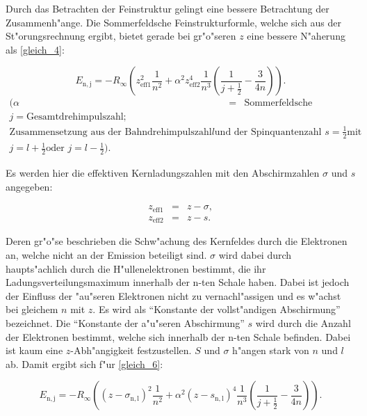 		Durch das Betrachten der Feinstruktur gelingt eine bessere Betrachtung der Zusammenh"ange.
		Die Sommerfeldsche Feinstrukturformle, welche sich aus der St"orungsrechnung ergibt, bietet gerade bei gr"o"seren $z$ eine bessere N"aherung als \ref{gleich_4}:

		\begin{equation}
			E_\mathrm{n,j} = -R_\infty \left(z_\mathrm{eff1}^2 \frac{1}{n^2} + \alpha^2 z_\mathrm{eff2}^4 \frac{1}{n^3} \left( \frac{1}{j + \frac{1}{2}} - \frac{3}{4n} \right) \right).\label{gleich_6}
		\end{equation}
		\begin{eqnarray*}
			(\alpha &=& \text{Sommerfeldsche Feinstrukturkonstante, und } \\
			j = \text{Gesamtdrehimpulszahl;} \\
			\text{Zusammensetzung aus der Bahndrehimpulszahl} l \text{und der Spinquantenzahl } s = \frac{1}{2} \text{mit}\\
			j = l + \frac{1}{2} \text{oder } j = l - \frac{1}{2}).
		\end{eqnarray*}

		Es werden hier die effektiven Kernladungszahlen mit den Abschirmzahlen $\sigma$ und $s$ angegeben:

		\begin{eqnarray*}
			z_\mathrm{eff1} &=& z - \sigma,\\
			z_\mathrm{eff2} &=& z - s.
		\end{eqnarray*}

		Deren gr"o"se beschrieben die Schw"achung des Kernfeldes durch die Elektronen an, welche nicht an der Emission beteiligt sind.
		$\sigma$ wird dabei durch haupts"achlich durch die H"ullenelektronen bestimmt, die ihr Ladungsverteilungsmaximum innerhalb der n-ten Schale haben.
		Dabei ist jedoch der Einfluss der "au"seren Elektronen nicht zu vernachl"assigen und es w"achst bei gleichem $n$ mit $z$.
		Es wird als "`Konstante der vollst"andigen Abschirmung"' bezeichnet.
		Die "`Konstante der a"u"seren Abschirmung"' $s$ wird durch die Anzahl der Elektronen bestimmt, welche sich innerhalb der n-ten Schale befinden.
		Dabei ist kaum eine $z$-Abh"angigkeit festzustellen.
		$S$ und $\sigma$ h"angen stark von $n$ und $l$ ab.
		Damit ergibt sich f"ur \ref{gleich_6}:

		\begin{equation}
			E_\mathrm{n,j} = -R_\infty \left( (z - \sigma_\mathrm{n,l})^2 \frac{1}{n^2} + \alpha^2 (z - s_\mathrm{n,l})^4 \frac{1}{n^3} \left( \frac{1}{j + \frac{1}{2}} - \frac{3}{4n} \right) \right). \label{gleich_7}
		\end{equation}

